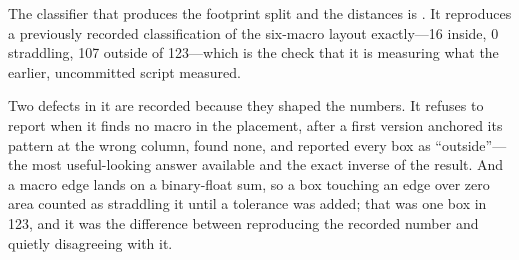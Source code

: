 \documentclass[11pt,a4paper]{article}
\begin{document}
The classifier that produces the footprint split and the distances is
{\small{}}. It reproduces a previously
recorded classification of the six-macro layout exactly---\num{16} inside,
\num{0} straddling, \num{107} outside of \num{123}---which is the check
that it is measuring what the earlier, uncommitted script measured.

Two defects in it are recorded because they shaped the numbers. It
refuses to report when it finds no macro in the placement, after a first
version anchored its pattern at the wrong column, found none, and
reported every box as ``outside''---the most useful-looking answer
available and the exact inverse of the result. And a macro edge lands on
a binary-float sum, so a box touching an edge over zero area counted as
straddling it until a tolerance was added; that was one box in \num{123},
and it was the difference between reproducing the recorded number and
quietly disagreeing with it.



\end{document}
